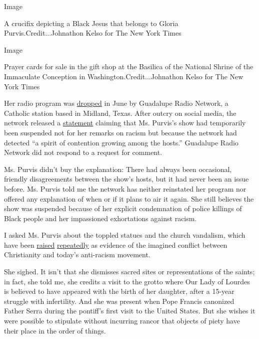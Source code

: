 Image

A crucifix depicting a Black Jesus that belongs to Gloria
Purvis.Credit...Johnathon Kelso for The New York Times

Image

Prayer cards for sale in the gift shop at the Basilica of the National
Shrine of the Immaculate Conception in Washington.Credit...Johnathon
Kelso for The New York Times

Her radio program was
\href{https://osvnews.com/2020/06/26/ewtns-largest-radio-affiliate-drops-morning-glory-as-host-gloria-purvis-continues-to-speak-out-about-racism/}{dropped}
in June by Guadalupe Radio Network, a Catholic station based in Midland,
Texas. After outcry on social media, the network released a
\href{https://www.grnonline.com/en/events/southeast}{statement} claiming
that Ms. Purvis's show had temporarily been suspended not for her
remarks on racism but because the network had detected ``a spirit of
contention growing among the hosts.'' Guadalupe Radio Network did not
respond to a request for comment.

Ms. Purvis didn't buy the explanation: There had always been occasional,
friendly disagreements between the show's hosts, but it had never been
an issue before. Ms. Purvis told me the network has neither reinstated
her program nor offered any explanation of when or if it plans to air it
again. She still believes the show was suspended because of her explicit
condemnation of police killings of Black people and her impassioned
exhortations against racism.

I asked Ms. Purvis about the toppled statues and the church vandalism,
which have been
\href{https://newdailycompass.com/en/the-senseless-hatred-of-st-junipero-serra}{raised}
\href{https://www.washingtontimes.com/news/2020/jul/15/black-lives-matter-protesters-turn-rage-churches-r/}{repeatedly}
as evidence of the imagined conflict between Christianity and today's
anti-racism movement.

She sighed. It isn't that she dismisses sacred sites or representations
of the saints; in fact, she told me, she credits a visit to the grotto
where Our Lady of Lourdes is believed to have appeared with the birth of
her daughter, after a 15-year struggle with infertility. And she was
present when Pope Francis canonized Father Serra during the pontiff's
first visit to the United States. But she wishes it were possible to
stipulate without incurring rancor that objects of piety have their
place in the order of things.

